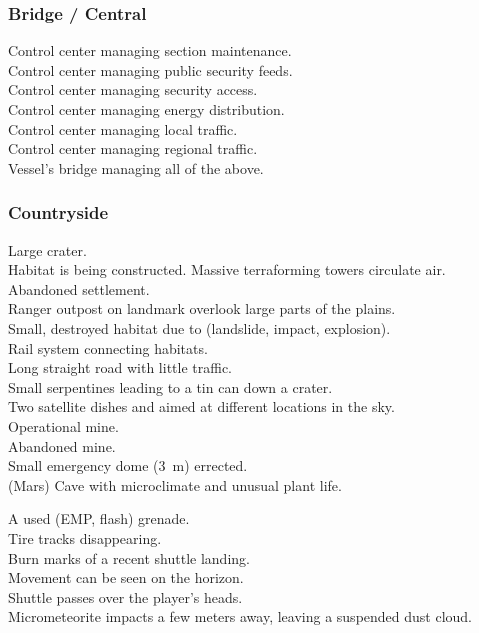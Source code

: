\documentclass[a4]{article}
\begin{document}
\subsubsection{Bridge / Central}

\starttableone
Control center managing section maintenance.\\
Control center managing public security feeds.\\
Control center managing security access.\\
Control center managing energy distribution.\\
Control center managing local traffic.\\
Control center managing regional traffic.\\
Vessel's bridge managing all of the above.\\
\stoptableone




\subsubsection{Countryside}

\starttableone
Large crater.\\
Habitat is being constructed.
Massive terraforming towers circulate air.\\
Abandoned settlement.\\
Ranger outpost on landmark overlook large parts of the plains.\\
Small, destroyed habitat due to (landslide, impact, explosion).\\
Rail system connecting habitats.\\
Long straight road with little traffic.\\
Small serpentines leading to a tin can down a crater.\\
Two satellite dishes and aimed at different locations in the sky.\\
Operational mine.\\
Abandoned mine.\\
Small emergency dome (\SI{3}{\m}) errected.\\
(Mars) Cave with microclimate and unusual plant life.\\
\stoptableone


\starttableone
A used (EMP, flash) grenade.\\
Tire tracks disappearing.\\
Burn marks of a recent shuttle landing.\\
Movement can be seen on the horizon.\\
Shuttle passes over the player's heads.\\
Micrometeorite impacts a few meters away, leaving a suspended dust cloud.\\
\stoptableone
\end{document}
